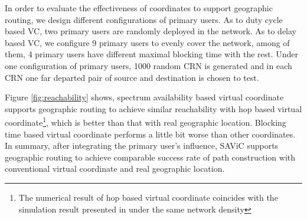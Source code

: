 In order to evaluate the effectiveness of coordinates to support geographic routing, we design different configurations of primary users.
As to duty cycle based VC, two primary users are randomly deployed in the network.
As to delay based VC, we configure 9 primary users to evenly cover the network, among of them, 4 primary users have different maximal blocking time with the rest.
Under one configuration of primary users, 1000 random CRN is generated and in each CRN one far departed pair of source and destination is chosen to test.


Figure \ref{fig:reachability} shows, spectrum availability based virtual coordinate supports geographic routing to achieve similar reachability with hop based virtual coordinate\footnote{The numerical result of hop based virtual coordinate coincides with the simulation result presented in \cite{gpsfree05infocom} under the same network density}, which is better than that with real geographic location.
Blocking time based virtual coordinate performs a little bit worse than other coordinates.
In summary, after integrating the primary user's influence, SAViC supports geographic routing to achieve comparable success rate of path construction with conventional virtual coordinate and real geographic location.



